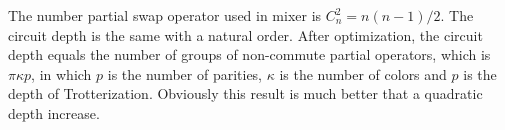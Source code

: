 \documentclass[aps,pra,twocolumn,superscriptaddress]{revtex4-2}
\begin{document}
The number partial swap operator used in mixer is $C^2_n=n(n-1)/2$. The circuit depth is the same with a natural order. After optimization, the circuit depth equals the number of groups of non-commute partial operators, which is $\pi \kappa p$, in which $p$ is the number of parities, $\kappa$ is the number of colors and $p$ is the depth of Trotterization. Obviously this result is much better that a quadratic depth increase.
\end{document}
